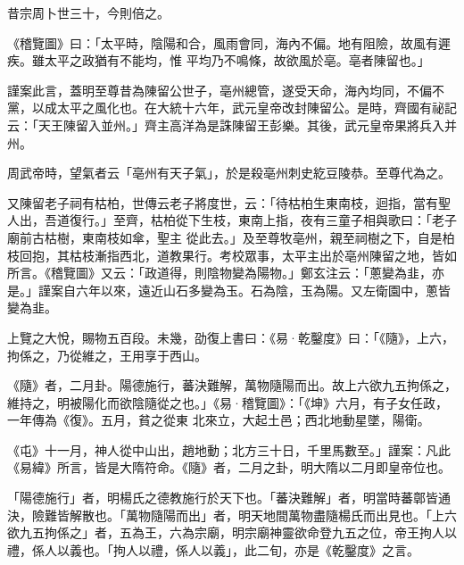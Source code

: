 \begin{pinyinscope}
 昔宗周卜世三十，今則倍之。



 《稽覽圖》曰：「太平時，陰陽和合，風雨會同，海內不偏。地有阻險，故風有遲疾。雖太平之政猶有不能均，惟
 平均乃不鳴條，故欲風於亳。亳者陳留也。」



 謹案此言，蓋明至尊昔為陳留公世子，亳州總管，遂受天命，海內均同，不偏不黨，以成太平之風化也。在大統十六年，武元皇帝改封陳留公。是時，齊國有祕記云：「天王陳留入並州。」齊主高洋為是誅陳留王彭樂。其後，武元皇帝果將兵入并州。



 周武帝時，望氣者云「亳州有天子氣」，於是殺亳州刺史紇豆陵恭。至尊代為之。



 又陳留老子祠有枯柏，世傳云老子將度世，云：「待枯柏生東南枝，迴指，當有聖人出，吾道復行。」至齊，枯柏從下生枝，東南上指，夜有三童子相與歌曰：「老子廟前古枯樹，東南枝如傘，聖主
 從此去。」及至尊牧亳州，親至祠樹之下，自是柏枝回抱，其枯枝漸指西北，道教果行。考校眾事，太平主出於亳州陳留之地，皆如所言。《稽覽圖》又云：「政道得，則陰物變為陽物。」鄭玄注云：「蔥變為韭，亦是。」謹案自六年以來，遠近山石多變為玉。石為陰，玉為陽。又左衛園中，蔥皆變為韭。



 上覽之大悅，賜物五百段。未幾，劭復上書曰：《易·乾鑿度》曰：「《隨》，上六，拘係之，乃從維之，王用享于西山。



 《隨》者，二月卦。陽德施行，蕃決難解，萬物隨陽而出。故上六欲九五拘係之，維持之，明被陽化而欲陰隨從之也。」《易·稽覽圖》：「《坤》六月，有子女任政，一年傳為《復》。五月，貧之從東
 北來立，大起土邑；西北地動星墜，陽衛。



 《屯》十一月，神人從中山出，趙地動；北方三十日，千里馬數至。」謹案：凡此《易緯》所言，皆是大隋符命。《隨》者，二月之卦，明大隋以二月即皇帝位也。



 「陽德施行」者，明楊氏之德教施行於天下也。「蕃決難解」者，明當時蕃鄣皆通決，險難皆解散也。「萬物隨陽而出」者，明天地間萬物盡隨楊氏而出見也。「上六欲九五拘係之」者，五為王，六為宗廟，明宗廟神靈欲命登九五之位，帝王拘人以禮，係人以義也。「拘人以禮，係人以義」，此二旬，亦是《乾鑿度》之言。




\end{pinyinscope}
